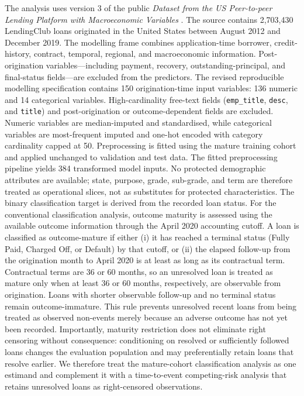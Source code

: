 \documentclass[10pt]{article}
\begin{document}
The analysis uses version 3 of the public \textit{Dataset from the US Peer-to-peer Lending Platform with Macroeconomic Variables} \cite{ref48}. The source contains 2,703,430 LendingClub loans originated in the United States between August 2012 and December 2019. The modelling frame combines application-time borrower, credit-history, contract, temporal, regional, and macroeconomic information. Post-origination variables---including payment, recovery, outstanding-principal, and final-status fields---are excluded from the predictors. The revised reproducible modelling specification contains 150 origination-time input variables: 136 numeric and 14 categorical variables. High-cardinality free-text fields (\texttt{emp\_title}, \texttt{desc}, and \texttt{title}) and post-origination or outcome-dependent fields are excluded. Numeric variables are median-imputed and standardised, while categorical variables are most-frequent imputed and one-hot encoded with category cardinality capped at 50. Preprocessing is fitted using the mature training cohort and applied unchanged to validation and test data. The fitted preprocessing pipeline yields 384 transformed model inputs. No protected demographic attributes are available; state, purpose, grade, sub-grade, and term are therefore treated as operational slices, not as substitutes for protected characteristics. The binary classification target is derived from the recorded loan status. For the conventional classification analysis, outcome maturity is assessed using the available outcome information through the April 2020 accounting cutoff. A loan is classified as outcome-mature if either (i) it has reached a terminal status (Fully Paid, Charged Off, or Default) by that cutoff, or (ii) the elapsed follow-up from the origination month to April 2020 is at least as long as its contractual term. Contractual terms are 36 or 60 months, so an unresolved loan is treated as mature only when at least 36 or 60 months, respectively, are observable from origination. Loans with shorter observable follow-up and no terminal status remain outcome-immature. This rule prevents unresolved recent loans from being treated as observed non-events merely because an adverse outcome has not yet been recorded. Importantly, maturity restriction does not eliminate right censoring without consequence: conditioning on resolved or sufficiently followed loans changes the evaluation population and may preferentially retain loans that resolve earlier. We therefore treat the mature-cohort classification analysis as one estimand and complement it with a time-to-event competing-risk analysis that retains unresolved loans as right-censored observations.
\end{document}
